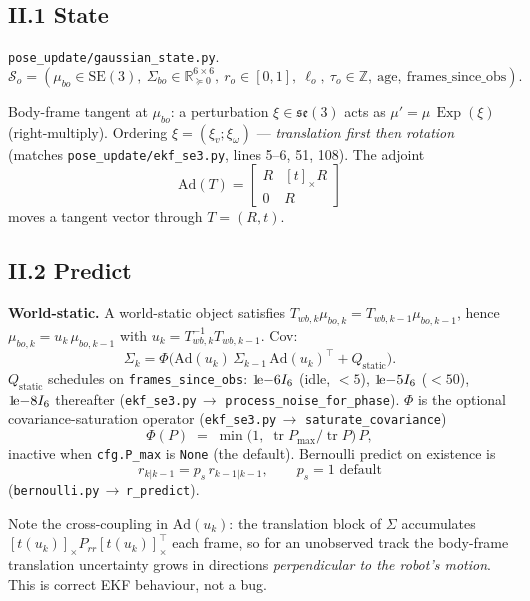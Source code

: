 \documentclass[11pt]{article}
\DeclareMathOperator{\Tr}{tr}
\DeclareMathOperator{\Exp}{Exp}
\newcommand{\R}{\mathbb{R}}
\newcommand{\SE}{\mathrm{SE}(3)}
\newcommand{\se}{\mathfrak{se}(3)}
\newcommand{\Ad}{\mathrm{Ad}}
\newcommand{\file}[1]{\texttt{#1}}
\begin{document}
\subsection*{II.1 State}

\file{pose\_update/gaussian\_state.py}.
$$\mathcal{S}_o = (\mu_{bo}\in\SE,\ \Sigma_{bo}\in\R^{6\times 6}_{\succeq 0},\
  r_o\in[0,1],\ \ell_o,\ \tau_o\in\mathbb{Z},\ \text{age},\ \text{frames\_since\_obs}).$$

Body-frame tangent at $\mu_{bo}$: a perturbation $\xi\in\se$ acts as
$\mu' = \mu\,\Exp(\xi)$ (right-multiply). Ordering
$\xi=(\xi_v;\xi_\omega)$ — \emph{translation first then rotation} (matches
\file{pose\_update/ekf\_se3.py}, lines 5--6, 51, 108). The adjoint
$$\Ad(T) = \begin{bmatrix} R & [t]_\times R \\ 0 & R \end{bmatrix}$$
moves a tangent vector through $T=(R,t)$.

\subsection*{II.2 Predict}

\textbf{World-static.} A world-static object satisfies
$T_{wb,k}\mu_{bo,k} = T_{wb,k-1}\mu_{bo,k-1}$, hence
$\mu_{bo,k} = u_k\,\mu_{bo,k-1}$ with
$u_k = T_{wb,k}^{-1}T_{wb,k-1}$. Cov:
\begin{equation}\label{eq:proc}
\Sigma_k = \Phi\!\bigl(\Ad(u_k)\,\Sigma_{k-1}\,\Ad(u_k)^\top + Q_{\text{static}}\bigr).
\end{equation}
$Q_{\text{static}}$ schedules on \texttt{frames\_since\_obs}:
$1\!{\rm e}{-6}I_6$ (idle, $<5$), $1\!{\rm e}{-5}I_6$ ($<50$),
$1\!{\rm e}{-8}I_6$ thereafter (\file{ekf\_se3.py}\,$\to$
\texttt{process\_noise\_for\_phase}). $\Phi$ is the optional
covariance-saturation operator (\file{ekf\_se3.py}\,$\to$
\texttt{saturate\_covariance})
\begin{equation}\label{eq:phi}
\Phi(P) \;=\; \min\!\bigl(1,\;\Tr P_{\max}/\Tr P\bigr)\,P,
\end{equation}
inactive when \texttt{cfg.P\_max} is \texttt{None} (the default).
Bernoulli predict on existence is
\begin{equation}\label{eq:bern_pred_r}
r_{k|k-1} = p_s\,r_{k-1|k-1}, \qquad p_s = 1 \text{ default}
\end{equation}
(\file{bernoulli.py}\,$\to$\,\texttt{r\_predict}).

Note the cross-coupling in $\Ad(u_k)$: the translation block of
$\Sigma$ accumulates $[t(u_k)]_\times P_{rr}[t(u_k)]_\times^\top$ each
frame, so for an unobserved track the body-frame translation
uncertainty grows in directions \emph{perpendicular to the robot's
motion}. This is correct EKF behaviour, not a bug.
\end{document}
